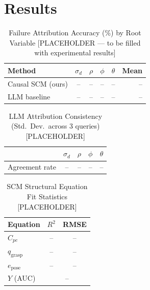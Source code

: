 \documentclass[journal]{IEEEtran}
\begin{document}
\section{Results}
\label{sec:results}

\begin{table}[t]
  \caption{Failure Attribution Accuracy (\%) by Root Variable
           [PLACEHOLDER --- to be filled with experimental results]}
  \label{tab:attribution}
  \centering
  \begin{tabular}{lccccr}
    \toprule
    \textbf{Method}
      & $\sigma_d$ & $\rho$ & $\phi$ & $\theta$ & \textbf{Mean} \\
    \midrule
    Causal SCM (ours) & -- & -- & -- & -- & -- \\
    LLM baseline      & -- & -- & -- & -- & -- \\
    \bottomrule
  \end{tabular}
\end{table}

\begin{table}[t]
  \caption{LLM Attribution Consistency (Std.\ Dev.\ across 3 queries)
           [PLACEHOLDER]}
  \label{tab:consistency}
  \centering
  \begin{tabular}{lcccc}
    \toprule
    & $\sigma_d$ & $\rho$ & $\phi$ & $\theta$ \\
    \midrule
    Agreement rate & -- & -- & -- & -- \\
    \bottomrule
  \end{tabular}
\end{table}

\begin{table}[t]
  \caption{SCM Structural Equation Fit Statistics [PLACEHOLDER]}
  \label{tab:scm_fit}
  \centering
  \begin{tabular}{lcc}
    \toprule
    \textbf{Equation} & $R^2$ & RMSE \\
    \midrule
    $C_{pc}$          & -- & -- \\
    $q_{\text{grasp}}$& -- & -- \\
    $e_{\text{pose}}$ & -- & -- \\
    $Y$ (AUC)         & \multicolumn{2}{c}{--} \\
    \bottomrule
  \end{tabular}
\end{table}
\end{document}
